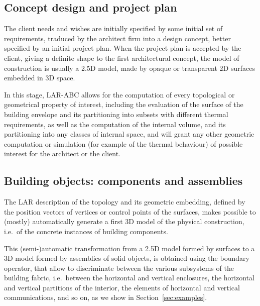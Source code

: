\documentclass[11pt,oneside]{article}    %
\begin{document}
\subsection{Concept design and project plan}
The client needs and wishes are initially specified by some initial set of requirements, traduced by the architect firm into a design concept, better specified by an initial project plan.
When the project plan is accepted by the client, giving a definite shape to the first architectural concept, the model of construction is usually a 2.5D model, made by opaque or transparent 2D surfaces embedded in 3D space. 

In this stage, LAR-ABC allows for the computation of every topological or geometrical property of interest, including the evaluation of the surface of the building envelope and its partitioning into subsets with different thermal requirements, as well as the computation of the internal volume, and its partitioning into any classes of internal space, and will grant any other geometric computation or simulation (for example of the thermal behaviour) of possible interest for the architect or the client.

\subsection{Building objects: components and assemblies}

The LAR description of the topology and its geometric embedding, defined by the position vectors of vertices or control points of the surfaces, makes possible to (mostly) automatically generate a first 3D model of the physical construction, i.e.~of the concrete instances of building components.

This (semi-)automatic transformation from a 2.5D model formed by surfaces to a 3D model formed by assemblies of solid objects, is obtained using the boundary operator, that allow to discriminate between the various subsystems of the building fabric, i.e.~between the horizontal and vertical enclosures, the horizontal and vertical partitions of the interior, the elements of horizontal and vertical communications, and so on, as we show in Section~\ref{sec:examples}. 
\end{document}
